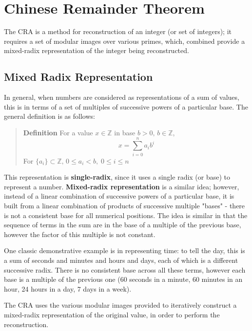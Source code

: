 \documentclass[letterpaper,12pt,titlepage,oneside,final]{book}
\newenvironment{defn}{\begin{quote}%
  \textbf{Definition }%
  \quad
}{%
\end{quote}%
}
\begin{document}
\section{Chinese Remainder Theorem} 

The CRA is a method for reconstruction of an integer (or set of integers); it requires a set of modular images over various primes, which, combined provide a mixed-radix representation of the integer being reconstructed.  

\subsection{Mixed Radix Representation}

In general, when numbers are considered as representations of a sum of values, this is in terms of a set of multiples of successive powers of a particular base.  The general definition is as follows:

\begin{defn}\label{Basic defn}
  For a value ${x \in \mathbb{Z}}$ in base ${b > 0,\, b \in \mathbb{Z}}$,
  \begin{equation*}   x = \sum\limits_{i = 0}^{n}{a_ib^i}     \end{equation*}
  For ${\{a_i\} \subset \mathbb{Z},\, 0 \leq a_i < b, \; 0 \leq i \leq n}$ 
\end{defn}

This representation is \textbf{single-radix}, since it uses a single radix (or base) to represent a number.  \textbf{Mixed-radix representation} is a similar idea; however, instead of a linear combination of successive powers of a particular base, it is built from a linear combination of products of successive multiple "bases" - there is not a consistent base for all numerical positions.  The idea is similar in that the sequence of terms in the sum are in the base of a multiple of the previous base, however the factor of this multiple is not constant.  

One classic demonstrative example is in representing time: to tell the day, this is a sum of seconds and minutes and hours and days, each of which is a different successive radix.  There is no consistent base across all these terms, however each base is a multiple of the previous one (60 seconds in a minute, 60 minutes in an hour, 24 hours in a day, 7 days in a week).     

The CRA uses the various modular images provided to iteratively construct a mixed-radix representation of the original value, in order to perform the reconstruction.
\end{document}
